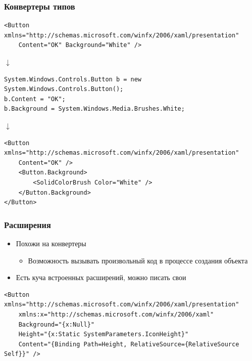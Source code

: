 \documentclass[xetex,mathserif,serif]{beamer}
\newcommand{\DownArrow} {
	\hspace{2cm}\begin{LARGE}$\downarrow$\end{LARGE}
}
\begin{document}
	\begin{frame}[fragile]
		\frametitle{Конвертеры типов}
		\begin{footnotesize}
			\begin{verbatim}
<Button xmlns="http://schemas.microsoft.com/winfx/2006/xaml/presentation"
    Content="OK" Background="White" />
			\end{verbatim}
		\end{footnotesize}

		\DownArrow
		\begin{footnotesize}
			\begin{verbatim}
System.Windows.Controls.Button b = new System.Windows.Controls.Button();
b.Content = "OK";
b.Background = System.Windows.Media.Brushes.White;
			\end{verbatim}
		\end{footnotesize}

		\DownArrow
		\begin{footnotesize}
			\begin{verbatim}
<Button xmlns="http://schemas.microsoft.com/winfx/2006/xaml/presentation"
    Content="OK" />
    <Button.Background>
        <SolidColorBrush Color="White" />
    </Button.Background>
</Button>
			\end{verbatim}
		\end{footnotesize}
	\end{frame}

	\begin{frame}[fragile]
		\frametitle{Расширения}
		\begin{itemize}
			\item Похожи на конвертеры
			\begin{itemize}
				\item Возможность вызывать произвольный код в процессе создания объекта
			\end{itemize}
			\item Есть куча встроенных расширений, можно писать свои
		\end{itemize}
		\begin{footnotesize}
			\begin{verbatim}
<Button xmlns="http://schemas.microsoft.com/winfx/2006/xaml/presentation"
    xmlns:x="http://schemas.microsoft.com/winfx/2006/xaml"
    Background="{x:Null}"
    Height="{x:Static SystemParameters.IconHeight}"
    Content="{Binding Path=Height, RelativeSource={RelativeSource Self}}" />
			\end{verbatim}
		\end{footnotesize}
	\end{frame}
\end{document}
